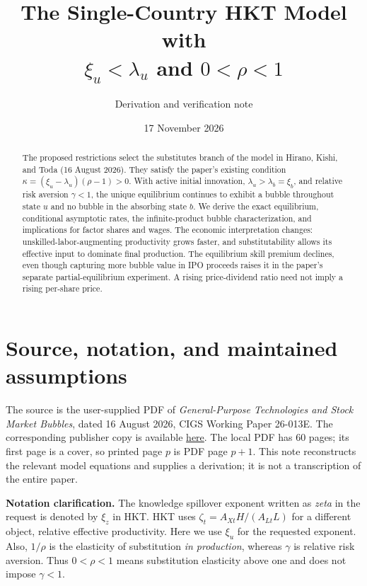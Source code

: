 \documentclass[11pt,a4paper]{article}
\title{The Single-Country HKT Model with\\
\texorpdfstring{$\xi_u<\lambda_u$ and $0<\rho<1$}{xi-u < lambda-u and 0 < rho < 1}}
\author{Derivation and verification note}
\date{17 November 2026}
\begin{document}
\maketitle
\begin{abstract}
The proposed restrictions select the substitutes branch of the model in Hirano,
Kishi, and Toda (16 August 2026). They satisfy the paper's existing condition
$\kappa=(\xi_u-\lambda_u)(\rho-1)>0$. With active initial innovation,
$\lambda_u>\lambda_b=\xi_b$, and relative risk aversion $\gamma<1$, the unique
equilibrium continues to exhibit a bubble throughout state $u$ and no bubble in
the absorbing state $b$. We derive the exact equilibrium, conditional asymptotic
rates, the infinite-product bubble characterization, and implications for factor
shares and wages. The economic interpretation changes: unskilled-labor-augmenting
productivity grows faster, and substitutability allows its effective input to
dominate final production. The equilibrium skill premium declines, even though
capturing more bubble value in IPO proceeds raises it in the paper's separate
partial-equilibrium experiment. A rising price-dividend ratio need not imply a
rising per-share price.
\end{abstract}

\section{Source, notation, and maintained assumptions}
The source is the user-supplied PDF of \emph{General-Purpose Technologies and
Stock Market Bubbles}, dated 16 August 2026, CIGS Working Paper 26-013E.
The corresponding publisher copy is available
\href{https://cigs.canon/en/uploads/2026/08/WP26-013E_260816_hirano.pdf}{here}.
The local PDF has 60 pages; its first page is a cover, so printed page $p$ is
PDF page $p+1$. This note reconstructs the relevant model equations and supplies
a derivation; it is not a transcription of the entire paper.

\textbf{Notation clarification.} The knowledge spillover exponent written as
\emph{zeta} in the request is denoted by $\xi_z$ in HKT. HKT uses
$\zeta_t=A_{Xt}H/(A_{Lt}L)$ for a different object, relative effective
productivity. Here we use $\xi_u$ for the requested exponent. Also,
$1/\rho$ is the elasticity of substitution \emph{in production}, whereas
$\gamma$ is relative risk aversion. Thus $0<\rho<1$ means substitution elasticity
above one and does not impose $\gamma<1$.
\end{document}
